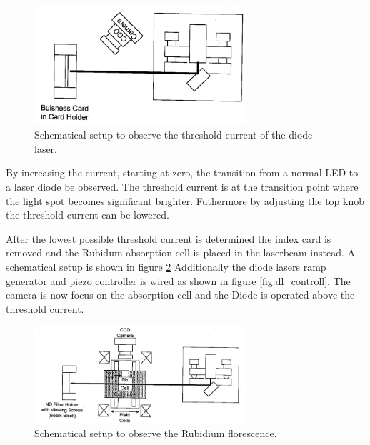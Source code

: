 \begin{figure}
  \centering
  \includegraphics[width=0.7\textwidth]{setup1.png}
  \caption{Schematical setup to observe the threshold current of the diode laser.\cite{V61}}
  \label{fig:setup1}
\end{figure}
By increasing the current, starting at zero, the transition from
a normal LED to a laser diode be observed.
The threshold current is at the
transition point where the light spot becomes significant brighter.
Futhermore by adjusting the top knob the threshold current can be lowered.


After the lowest possible threshold current is determined the
index card is removed and
the Rubidum absorption cell
is placed in the laserbeam instead.
A schematical setup is shown in figure \ref{fig:setup2}
Additionally the diode lasers ramp generator and  piezo controller is wired as shown in figure \ref{fig:dl_controll}.
The camera is now
focus on the absorption cell and
the Diode is operated above the threshold current.
\begin{figure}
  \centering
  \includegraphics[width=0.7\textwidth]{setup2.png}
  \caption{Schematical setup to observe the Rubidium florescence.\cite{V61}}
  \label{fig:setup2}
\end{figure}

